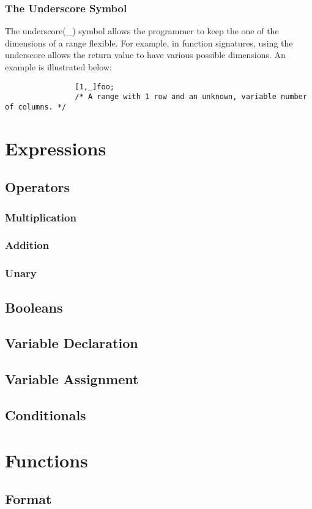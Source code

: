 \documentclass[titlepage]{article}
\begin{document}
		\subsubsection{The Underscore Symbol}
			The underscore(\_) symbol allows the programmer to keep the one of the dimensions of a range flexible. For example, in function signatures, using the underscore allows the return value to have various possible dimensions. An example is illustrated below:
			\begin{lstlisting}
				[1,_]foo; 
				/* A range with 1 row and an unknown, variable number of columns. */
			\end{lstlisting}
\section{Expressions}
\subsection{Operators}
\subsubsection{Multiplication}
\subsubsection{Addition}
\subsubsection{Unary}
\subsection{Booleans}
\subsection{Variable Declaration}
\subsection{Variable Assignment}
\subsection{Conditionals}
\section{Functions}
\subsection{Format}
\end{document}
